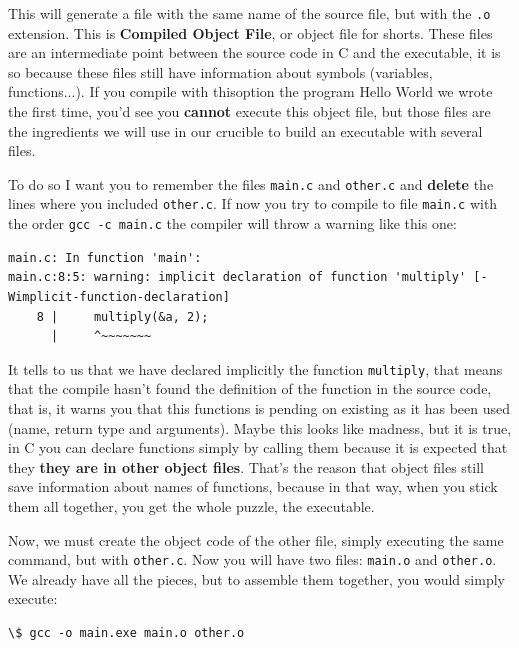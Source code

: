 \documentclass[a4paper]{article}
\begin{document}
This will generate a file with the same name of the source file, but with the
\verb!.o! extension. This is \textbf{Compiled Object File}, or object file for
shorts. These files are an intermediate point between the source code in C and
the executable, it is so because these files still have information about
symbols (variables, functions...). If you compile with thisoption the program
Hello World we wrote the first time, you'd see you \textbf{cannot} execute
this object file, but those files are the ingredients we will use in our
crucible to build an executable with several files.

To do so I want you to remember the files \verb!main.c! and \verb!other.c! and
\textbf{delete} the lines where you included \verb!other.c!. If now you try to
compile to file \verb!main.c! with the order \verb!gcc -c main.c! the compiler
will throw a warning like this one:

\begin{lstlisting}[style=terminalStyle]
main.c: In function 'main':
main.c:8:5: warning: implicit declaration of function 'multiply' [-Wimplicit-function-declaration]
    8 |     multiply(&a, 2);
      |     ^~~~~~~~
\end{lstlisting}

It tells to us that we have declared implicitly the function \verb!multiply!,
that means that the compile hasn't found the definition of the function in the
source code, that is, it warns you that this functions is pending on existing
as it has been used (name, return type and arguments). Maybe this looks like
madness, but it is true, in C you can declare functions simply by calling them
because it is expected that they \textbf{they are in other object files}.
That's the reason that object files still save information about names of
functions, because in that way, when you stick them all together, you get
the whole puzzle, the executable.

Now, we must create the object code of the other file, simply executing the same
command, but with \verb!other.c!. Now you will have two files: \verb!main.o! and
\verb!other.o!. We already have all the pieces, but to assemble them together,
you would simply execute:
\begin{lstlisting}[style=terminalStyle]
\$ gcc -o main.exe main.o other.o
\end{lstlisting}
\end{document}
